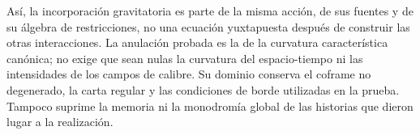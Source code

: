 Así, la incorporación gravitatoria es parte de la misma acción,
de sus fuentes y de su álgebra de restricciones, no una ecuación
yuxtapuesta después de construir las otras interacciones. La
anulación probada es la de la curvatura característica canónica;
no exige que sean nulas la curvatura del espacio-tiempo ni las
intensidades de los campos de calibre. Su dominio conserva el
coframe no degenerado, la carta regular y las condiciones de
borde utilizadas en la prueba. Tampoco suprime la memoria ni la
monodromía global de las historias que dieron lugar a la
realización.
